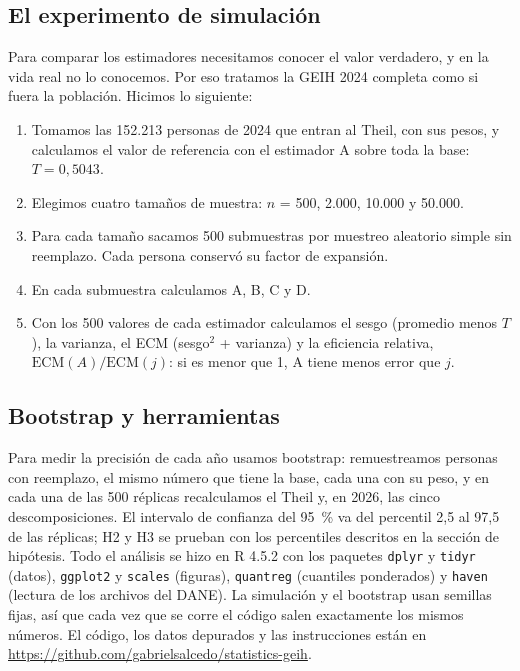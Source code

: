 \documentclass[12pt,letterpaper]{article}
\begin{document}
\subsection{El experimento de simulación}

Para comparar los estimadores necesitamos conocer el valor verdadero, y en la vida real no lo conocemos. Por eso tratamos la GEIH 2024 completa como si fuera la población. Hicimos lo siguiente:
\begin{enumerate}[leftmargin=0.75in]
  \item Tomamos las 152.213 personas de 2024 que entran al Theil, con sus pesos, y calculamos el valor de referencia con el estimador A sobre toda la base: $T = 0,5043$.
  \item Elegimos cuatro tamaños de muestra: $n$ = 500, 2.000, 10.000 y 50.000.
  \item Para cada tamaño sacamos 500 submuestras por muestreo aleatorio simple sin reemplazo. Cada persona conservó su factor de expansión.
  \item En cada submuestra calculamos A, B, C y D.
  \item Con los 500 valores de cada estimador calculamos el sesgo (promedio menos $T$), la varianza, el ECM (sesgo$^2$ + varianza) y la eficiencia relativa, $\text{ECM}(A)/\text{ECM}(j)$: si es menor que 1, A tiene menos error que $j$.
\end{enumerate}

\subsection{Bootstrap y herramientas}

Para medir la precisión de cada año usamos bootstrap: remuestreamos personas con reemplazo, el mismo número que tiene la base, cada una con su peso, y en cada una de las 500 réplicas recalculamos el Theil y, en 2026, las cinco descomposiciones. El intervalo de confianza del 95~\% va del percentil 2,5 al 97,5 de las réplicas; H2 y H3 se prueban con los percentiles descritos en la sección de hipótesis. Todo el análisis se hizo en R 4.5.2 con los paquetes \texttt{dplyr} y \texttt{tidyr} (datos), \texttt{ggplot2} y \texttt{scales} (figuras), \texttt{quantreg} (cuantiles ponderados) y \texttt{haven} (lectura de los archivos del DANE). La simulación y el bootstrap usan semillas fijas, así que cada vez que se corre el código salen exactamente los mismos números. El código, los datos depurados y las instrucciones están en \url{https://github.com/gabrielsalcedo/statistics-geih}.
\end{document}
